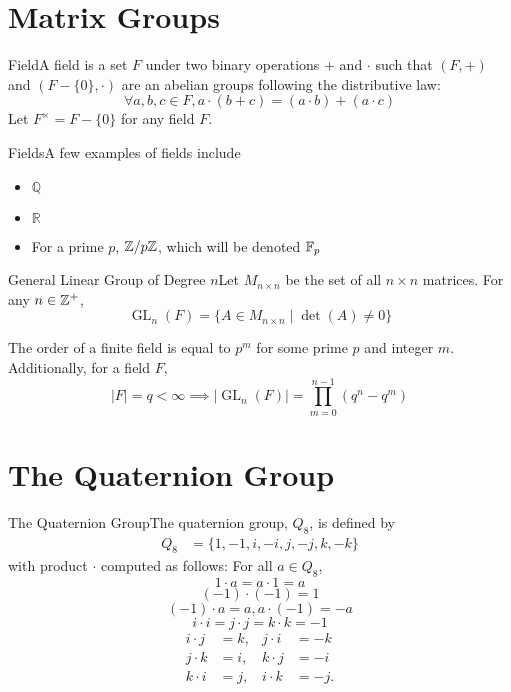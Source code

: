 \documentclass{report}
\newcommand{\ex}[2]{\begin{Example}{#1}{}#2\end{Example}}
\newcommand{\dfn}[2]{\begin{Definition}[colbacktitle=red!75!black]{#1}{}#2\end{Definition}}
\DeclareMathOperator{\GL}{GL} %
\newcommand{\bbQ}{\mathbb{Q}}	\newcommand{\bbR}{\mathbb{R}}
\begin{document}
\section{Matrix Groups}
\dfn{Field}{A field is a set $F$ under two binary operations $+$ and $\cdot$ such that $(F, +)$ and $(F-\{0\}, \cdot)$ are an abelian groups following the distributive law:
$$\forall a,b,c \in F, a\cdot(b+c) = (a \cdot b) + (a \cdot c)$$
Let $F^\times = F - \{0\}$ for any field $F$.}
\ex{Fields}{A few examples of fields include\begin{itemize}
    \item $\bbQ$
    \item $\bbR$
    \item For a prime $p$, $\mathbb{Z} / p\mathbb{Z}$, which will be denoted $\mathbb{F}_p$
\end{itemize}}
\dfn{General Linear Group of Degree $n$}{Let $M_{n \times n}$ be the set of all $n \times n$ matrices. For any $n \in \mathbb{Z}^+$, $$\GL_n (F) = \{A \in M_{n \times n} \mid \det (A) \neq 0 \}$$}
The order of a finite field is equal to $p^m$ for some prime $p$ and integer $m$. Additionally, for a field $F$, 
$$|F| = q < \infty \implies |\GL_n(F)|=\prod_{m=0}^{n-1} (q^n -q^m)$$

\section{The Quaternion Group}
\dfn{The Quaternion Group}{The quaternion group, \( Q_8 \), is defined by
\begin{align*}
Q_8 &= \{1, -1, i, -i, j, -j, k, -k\}
\end{align*}
with product \(\cdot\) computed as follows: For all $a \in Q_8$, $$1 \cdot a = a \cdot 1 =a$$
$$(-1) \cdot (-1) = 1$$
$$(-1) \cdot a = a, a\cdot (-1) = -a$$
$$i \cdot i = j \cdot j = k \cdot k = -1 $$
\begin{align*}
i \cdot j &= k, & j \cdot i &= -k \\
j \cdot k &= i, & k \cdot j &= -i \\
k \cdot i &= j, & i \cdot k &= -j.
\end{align*}}
\end{document}
